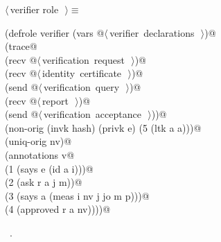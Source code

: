 \documentclass[titlepage,12pt]{article}
\theoremstyle{definition}
\begin{document}
\begin{flushleft} \small
\begin{minipage}{\linewidth} \label{scrap19}
$\langle\,$verifier role\nobreak\ {\footnotesize {}}$\,\rangle\equiv$
\vspace{-1ex}
\begin{list}{}{} \item
\mbox{}\verb@(defrole verifier (vars @\hbox{$\langle\,$verifier declarations\nobreak\ {\footnotesize {}}$\,\rangle$}\verb@)@\\
\mbox{}\verb@  (trace@\\
\mbox{}\verb@    (recv @\hbox{$\langle\,$verification request\nobreak\ {\footnotesize {}}$\,\rangle$}\verb@)@\\
\mbox{}\verb@    (recv @\hbox{$\langle\,$identity certificate\nobreak\ {\footnotesize {}}$\,\rangle$}\verb@)@\\
\mbox{}\verb@    (send @\hbox{$\langle\,$verification query\nobreak\ {\footnotesize {}}$\,\rangle$}\verb@)@\\
\mbox{}\verb@    (recv @\hbox{$\langle\,$report\nobreak\ {\footnotesize {}}$\,\rangle$}\verb@)@\\
\mbox{}\verb@    (send @\hbox{$\langle\,$verification acceptance\nobreak\ {\footnotesize {}}$\,\rangle$}\verb@))@\\
\mbox{}\verb@  (non-orig (invk hash) (privk e) (5 (ltk a a)))@\\
\mbox{}\verb@  (uniq-orig nv)@\\
\mbox{}\verb@  (annotations v@\\
\mbox{}\verb@    (1 (says e (id a i)))@\\
\mbox{}\verb@    (2 (ask r a j m))@\\
\mbox{}\verb@    (3 (says a (meas i nv j jo m p)))@\\
\mbox{}\verb@    (4 (approved r a nv))))@{\NWsep}
\end{list}
\vspace{-1ex}
\footnotesize\addtolength{\baselineskip}{-1ex}
\begin{list}{}{\setlength{\itemsep}{-\parsep}\setlength{\itemindent}{-\leftmargin}}
\item \NWtxtMacroRefIn\ .
\end{list}
\end{minipage}\\[4ex]
\end{flushleft}
\end{document}
